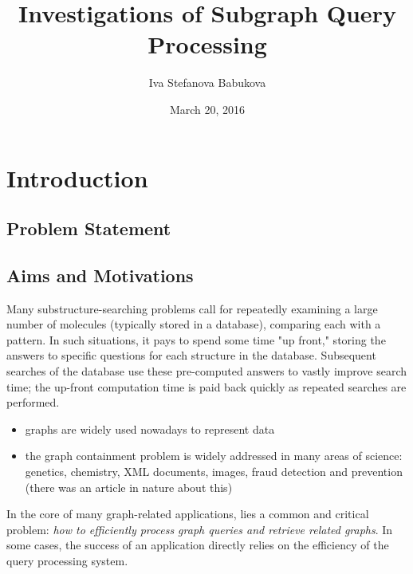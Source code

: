 \documentclass{l4proj}
\begin{document}
\title{Investigations of Subgraph Query Processing}
\author{Iva Stefanova Babukova}
\date{March 20, 2016}
\maketitle

\begin{abstract}


\end{abstract}

\educationalconsent
%
%
\tableofcontents
\chapter{Introduction}
	\section{Problem Statement}
    \section{Aims and Motivations}
    
    Many substructure-searching problems call for repeatedly examining a large number of molecules (typically stored in a database), comparing each with a pattern. In such situations, it pays to spend some time "up front," storing the answers to specific questions for each structure in the database. Subsequent searches of the database use these pre-computed answers to vastly improve search time; the up-front computation time is paid back quickly as repeated searches are performed.


    
        \begin{itemize}
            \item graphs are widely used nowadays to represent data
            \item the graph containment problem is widely addressed in many areas of science: genetics, chemistry, XML documents, images, fraud detection and prevention (there was an article in nature about this)
        \end{itemize}
        
        In the core of many graph-related applications, lies a common and critical problem: \textit{how to efficiently process graph queries and retrieve related graphs}. In some cases, the success of an application directly relies on the efficiency of the query processing system.  
        
\end{document}
